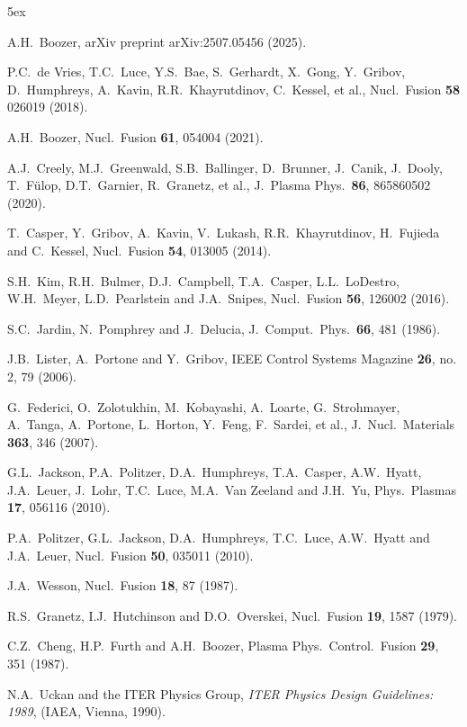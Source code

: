 \documentclass[12pt,prb,aps]{revtex4-1}
\begin{document}
\begin{thebibliography}{99}\baselineskip 5ex

   A.H.~Boozer, arXiv preprint arXiv:2507.05456 (2025). 

 P.C.~de Vries, T.C.~Luce, Y.S.~Bae, S.~Gerhardt, X.~Gong, Y.~Gribov, 
D.~Humphreys, A.~Kavin, R.R.~Khayrutdinov, C.~Kessel, et al., Nucl.\ Fusion {\bf 58} 026019 (2018).

 A.H.~Boozer, Nucl.\ Fusion {\bf 61}, 054004 (2021). 

 A.J.~Creely, M.J.~Greenwald, S.B.~Ballinger, D.~Brunner, J.~Canik, J.~Dooly, 
T.~F\"{u}lop, D.T.~Garnier, R.~Granetz, et al.,  J.\ Plasma Phys.\ {\bf 86}, 865860502 (2020).

 T.~Casper, Y.~Gribov, A.~Kavin, V.~Lukash, R.R.~Khayrutdinov, H.~Fujieda and C.~Kessel, Nucl.\ Fusion {\bf 54}, 013005 (2014).

 S.H.~Kim, R.H.~Bulmer, D.J.~Campbell, T.A.~Casper, L.L.~LoDestro, W.H.~Meyer, L.D.~Pearlstein and J.A.~Snipes,
Nucl.\ Fusion {\bf 56}, 126002 (2016).

 S.C.~Jardin, N.~Pomphrey and J.~Delucia, J.\ Comput.\ Phys.\ {\bf 66}, 481 (1986).

 J.B.~Lister, A.~Portone and Y.~Gribov, IEEE Control Systems Magazine {\bf 26}, no. 2, 79 (2006).

 G.~Federici, O.~Zolotukhin, M.~Kobayashi, A.~Loarte, G.~Strohmayer, A.~Tanga, A.~Portone, L.~Horton,
Y.~Feng, F.~Sardei, et al., J.\ Nucl.\ Materials {\bf 363}, 346 (2007). 

 G.L.~Jackson, P.A.~Politzer, D.A.~Humphreys, T.A.~Casper, A.W.~Hyatt, J.A.~Leuer, J.~Lohr,
T.C.~Luce, M.A.~Van Zeeland and J.H.~Yu, Phys.\ Plasmas {\bf 17}, 056116 (2010).

 P.A.~Politzer, G.L.~Jackson, D.A.~Humphreys, T.C.~Luce, A.W.~Hyatt and J.A.~Leuer, Nucl.\ Fusion {\bf 50}, 035011 (2010).

 J.A.~Wesson, Nucl.\ Fusion {\bf 18}, 87 (1987).

 R.S.~Granetz, I.J.~Hutchinson and D.O.~Overskei, Nucl.\ Fusion {\bf 19}, 1587 (1979).

 C.Z.~Cheng, H.P.~Furth and A.H.~Boozer, Plasma Phys.\ Control.\ Fusion {\bf 29}, 351 (1987).

 N.A.~Uckan and the ITER Physics Group, {\em ITER Physics Design Guidelines: 1989},  (IAEA, Vienna, 1990).


\end{thebibliography}
\end{document}
